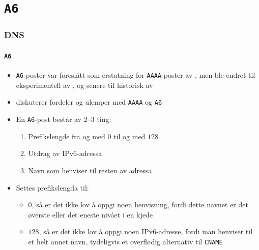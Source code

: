 \section{\texttt{A6}}
\begin{frame}%
  \frametitle{DNS}
  \framesubtitle{\texttt{A6}}
  \begin{itemize}%
  \item \texttt{A6}-poster var foreslått som erstatning for
    \texttt{AAAA}-poster av , men ble endret til
    eksperimentell av , og senere til historisk av
  \item {} diskuterer fordeler og ulemper med \texttt{AAAA} og
    \texttt{A6}
  \item En \texttt{A6}-post består av 2--3 ting:
    \begin{enumerate}%
    \item Prefikslengde fra og med \(0\) til og med \(128\)
    \item Utdrag av IPv6-adressa
    \item Navn som henviser til resten av adressa
    \end{enumerate}
  \item Settes prefikslengda til:
    \begin{itemize}%
    \item \(0\), så er det \alert{ikke} lov å oppgi noen henvisning,
      fordi dette navnet er det øverste eller det eneste nivået i en
      kjede
    \item \(128\), så er det \alert{ikke} lov å oppgi noen IPv6-adresse,
      fordi man henviser til et helt annet navn, tydeligvis et
      overflødig alternativ til \texttt{CNAME}
    \end{itemize}
  \end{itemize}
\end{frame}

